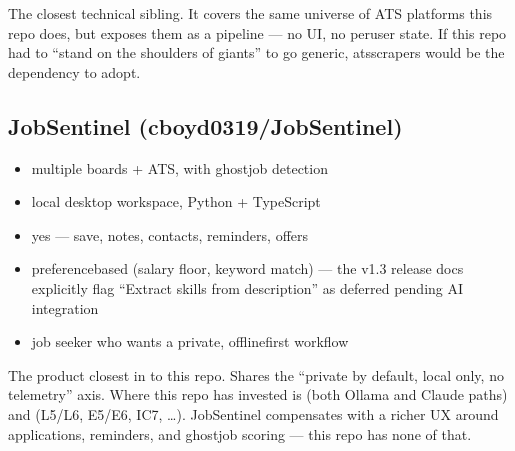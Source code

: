 \documentclass[a4paper,11pt,english]{sphinxmanual}
\begin{document}
\sphinxAtStartPar
{} The closest technical sibling. It covers the same universe
of ATS platforms this repo does, but exposes them as a pipeline — no UI,
no per\sphinxhyphen{}user state. If this repo had to “stand on the shoulders of giants”
to go generic, ats\sphinxhyphen{}scrapers would be the dependency to adopt.


\subsection{JobSentinel (cboyd0319/JobSentinel)}
\label{\detokenize{analysis:jobsentinel-cboyd0319-jobsentinel}}\begin{itemize}
\item {} 
\sphinxAtStartPar
{} multiple boards + ATS, with ghost\sphinxhyphen{}job detection

\item {} 
\sphinxAtStartPar
{} local desktop workspace, Python + TypeScript

\item {} 
\sphinxAtStartPar
{} yes — save, notes, contacts, reminders, offers

\item {} 
\sphinxAtStartPar
{} preference\sphinxhyphen{}based (salary floor, keyword match) — the
v1.3 release docs explicitly flag “Extract skills from description”
as deferred pending AI integration

\item {} 
\sphinxAtStartPar
{} job seeker who wants a private, offline\sphinxhyphen{}first workflow

\end{itemize}

\sphinxAtStartPar
{} The product closest in  to this repo. Shares the
“private by default, local only, no telemetry” axis. Where this repo
has invested is  (both Ollama and
Claude paths) and  (L5/L6, E5/E6,
IC7, …). JobSentinel compensates with a richer UX around applications,
reminders, and ghost\sphinxhyphen{}job scoring — this repo has none of that.
\end{document}
